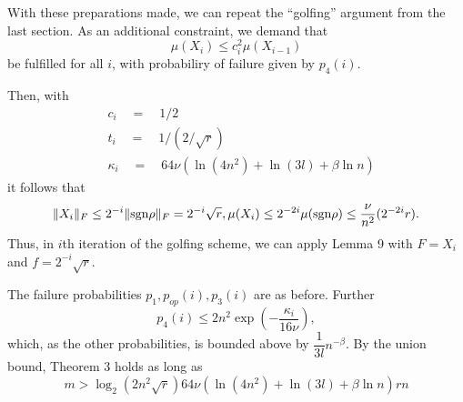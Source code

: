 \documentclass{article}
\begin{document}
With these preparations made, we can repeat the ``golfing'' argument from the last section. As an additional constraint, we demand that
\[
\mu(X_i) \le c_i^2\mu(X_{i-1})
\]
be fulfilled for all $i$, with probabiliry of failure given by $p_4(i)$.

Then, with
\begin{align*}
& c_i\quad =\quad 1/2\\
& t_i\quad =\quad 1/(2/\sqrt{r})\\
& \kappa_i\quad = \quad 64\nu(\ln(4n^2)+\ln(3l)+\beta \ln n)
\end{align*}
it follows that
\[
\|X_i\|_F \le 2^{-i}\|\text{sgn} \rho\|_F = 2^{-i}\sqrt{r},\\
\mu(X_i) \le 2^{-2i}\mu(\text{sgn} \rho) \le \dfrac{\nu}{n^2}(2^{-2i}r).
\]
Thus, in $i$th iteration of the golfing scheme, we can apply Lemma 9 with $F = X_i$ and $f = 2^{-i}\sqrt{r}$.

The failure probabilities $p_1,p_{op}(i),p_3(i)$ are as before. Further
\[
p_4(i) \le 2n^2 \exp\left( -\dfrac{\kappa_i}{16\nu} \right),
\]
which, as the other probabilities, is bounded above by $\dfrac{1}{3l}n^{-\beta}$. By the union bound, Theorem 3 holds as long as 
\[
m > \log_2(2n^2\sqrt{r}) 64\nu(\ln(4n^2)+\ln(3l)+\beta\ln n) rn
\]
\end{document}
